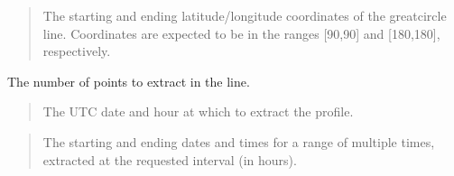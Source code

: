 \documentclass[letterpaper,10pt,english]{sphinxmanual}
\begin{document}
\sphinxAtStartPar
{}

\sphinxAtStartPar
{}
\begin{quote}

\sphinxAtStartPar
The starting and ending latitude/longitude coordinates of the great\sphinxhyphen{}circle line.  Coordinates are expected to be in the ranges {[}\sphinxhyphen{}90,90{]} and {[}\sphinxhyphen{}180,180{]}, respectively.
\end{quote}
\begin{description}
\sphinxAtStartPar
The number of points to extract in the line.

\end{description}

\sphinxAtStartPar
{}

\sphinxAtStartPar
{}
\begin{quote}

\sphinxAtStartPar
The UTC date and hour  at which to extract the profile.
\end{quote}

\sphinxAtStartPar
{}

\sphinxAtStartPar
{}
\begin{quote}

\sphinxAtStartPar
The starting and ending dates and times for a range of multiple times, extracted at the requested interval (in hours).
\end{quote}
\end{document}
